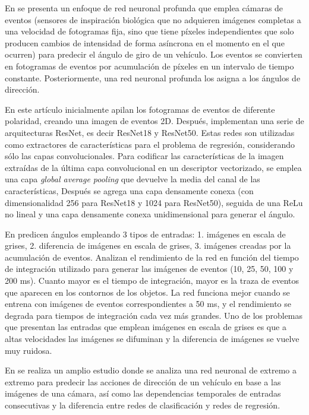 En \cite{event} se presenta un enfoque de red neuronal profunda que emplea cámaras de eventos (sensores de inspiración biológica que no adquieren imágenes completas a una velocidad de fotogramas fija, sino que tiene píxeles independientes que solo producen cambios de intensidad de forma asíncrona en el momento en el que ocurren) para predecir el ángulo de giro de un vehículo. Los eventos se convierten en fotogramas de eventos por acumulación de píxeles en un intervalo de tiempo constante. Posteriormente, una red neuronal profunda los asigna a los ángulos de dirección.

En este artículo inicialmente apilan los fotogramas de eventos de diferente polaridad, creando una imagen de eventos 2D. Después, implementan una serie de arquitecturas ResNet, es decir ResNet18 y ResNet50. Estas redes son utilizadas como extractores de características para el problema de regresión, considerando sólo las capas convolucionales. Para codificar las características de la imagen extraídas de la última capa convolucional en un descriptor vectorizado, se emplea una capa \textit{global average pooling} que devuelve la media del canal de las características, Después se agrega una capa densamente conexa (con dimensionalidad 256 para ResNet18 y 1024 para ResNet50), seguida de una ReLu no lineal y una capa densamente conexa unidimensional para generar el ángulo.

En  \cite{event} predicen ángulos empleando 3 tipos de entradas: 1. imágenes en escala de grises, 2. diferencia de imágenes en escala de grises, 3. imágenes creadas por la acumulación de eventos. Analizan el rendimiento de la red en función del tiempo de integración utilizado para generar las imágenes de eventos (10, 25, 50, 100 y 200 ms). Cuanto mayor es el tiempo de integración, mayor es la traza de eventos que aparecen en los contornos de los objetos. La red funciona mejor cuando se entrena con imágenes de eventos correspondientes a 50 ms, y el rendimiento se degrada para tiempos de integración cada vez más grandes. Uno de los problemas que presentan las entradas que emplean imágenes en escala de grises es que a altas velocidades las imágenes se difuminan y la diferencia de imágenes se vuelve muy ruidosa.

En \cite{pixels} se realiza un amplio estudio donde se analiza una red neuronal de extremo a extremo para predecir las acciones de dirección de un vehículo en base a las imágenes de una cámara, así como las dependencias temporales de entradas consecutivas y la diferencia entre redes de clasificación y redes de regresión.

